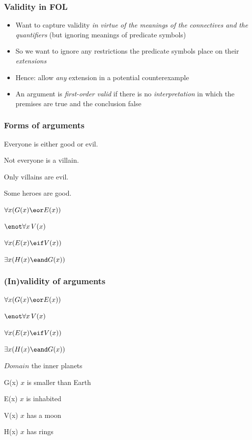 \begin{frame}
\frametitle{Validity in FOL}

\begin{itemize}[<+->]
\item Want to capture validity \emph{in virtue of the meanings of the
  connectives and the quantifiers} (but ignoring meanings of predicate
  symbols)
\item So we want to ignore any restrictions the predicate symbols place on their \emph{extensions}
\item Hence: allow \emph{any} extension in a potential counterexample
\item An argument is \emph{first-order valid} if there is no \emph{interpretation} in which the premises are true and the conclusion false
\end{itemize}
\end{frame}


\begin{frame}
\frametitle{Forms of arguments}

\begin{earg}
  \item[] Everyone is either good or evil.
  \item[] Not everyone is a villain.
  \item[] Only villains are evil.
  \item[\therefore] Some heroes are good.
\end{earg}

\begin{earg}
\item[] $\forall x( G(x) \eor  E(x))$
\item[] $\enot \forall x\, V(x)$
\item[] $\forall x (E(x) \eif V(x))$
\item[\therefore] $\exists x (H(x) \eand G(x))$
\end{earg}

\end{frame}


\begin{frame}
\frametitle{(In)validity of arguments}

\begin{earg}
\item[] $\forall x( G(x) \eor  E(x))$
\item[] $\enot \forall x\, V(x)$
\item[] $\forall x (E(x) \eif V(x))$
\item[\therefore] $\exists x (H(x) \eand G(x))$
\end{earg}

\begin{ekey}
\item[$Domain$] the inner planets
\item[G(x)] $x$ is smaller than Earth
\item[E(x)] $x$ is inhabited
\item[V(x)] $x$ has a moon
\item[H(x)] $x$ has rings
\end{ekey}
\end{frame}

